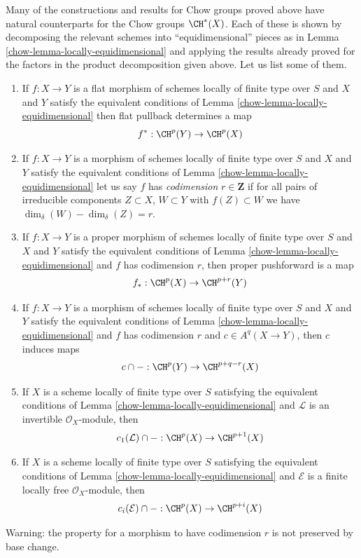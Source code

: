 \medskip\noindent
Many of the constructions and results for Chow groups proved above have
natural counterparts for the Chow groups $\CH^*(X)$. Each of these is
shown by decomposing the relevant schemes into ``equidimensional'' pieces
as in Lemma \ref{chow-lemma-locally-equidimensional}
and applying the results already proved for the
factors in the product decomposition given above.
Let us list some of them.
\begin{enumerate}
\item If $f : X \to Y$ is a flat morphism of schemes locally of finite type
over $S$ and $X$ and $Y$ satisfy the equivalent conditions of
Lemma \ref{chow-lemma-locally-equidimensional} then flat pullback determines a map
$$
f^* : \CH^p(Y) \to \CH^p(X)
$$
\item If $f : X \to Y$ is a morphism of schemes locally of finite type
over $S$ and $X$ and $Y$ satisfy the equivalent conditions of
Lemma \ref{chow-lemma-locally-equidimensional} let us say $f$ has
{\it codimension} $r \in \mathbf{Z}$ if for all pairs of irreducible components
$Z \subset X$, $W \subset Y$ with $f(Z) \subset W$ we have
$\dim_\delta(W) - \dim_\delta(Z) = r$.
\item If $f : X \to Y$ is a proper morphism of schemes locally of finite type
over $S$ and $X$ and $Y$ satisfy the equivalent conditions of
Lemma \ref{chow-lemma-locally-equidimensional} and $f$ has codimension $r$,
then proper pushforward is a map
$$
f_* : \CH^p(X) \to \CH^{p + r}(Y)
$$
\item If $f : X \to Y$ is a morphism of schemes locally of finite type over $S$
and $X$ and $Y$ satisfy the equivalent conditions of
Lemma \ref{chow-lemma-locally-equidimensional} and $f$ has codimension $r$
and $c \in A^q(X \to Y)$, then $c$ induces maps
$$
c \cap -  : \CH^p(Y) \to \CH^{p + q - r}(X)
$$
\item If $X$ is a scheme locally of finite type over $S$
satisfying the equivalent conditions of
Lemma \ref{chow-lemma-locally-equidimensional} and
$\mathcal{L}$ is an invertible $\mathcal{O}_X$-module,
then
$$
c_1(\mathcal{L}) \cap - : \CH^p(X) \to \CH^{p + 1}(X)
$$
\item If $X$ is a scheme locally of finite type over $S$
satisfying the equivalent conditions of
Lemma \ref{chow-lemma-locally-equidimensional} and
$\mathcal{E}$ is a finite locally free $\mathcal{O}_X$-module,
then
$$
c_i(\mathcal{E}) \cap - : \CH^p(X) \to \CH^{p + i}(X)
$$
\end{enumerate}
Warning: the property for a morphism to have codimension $r$
is not preserved by base change.

